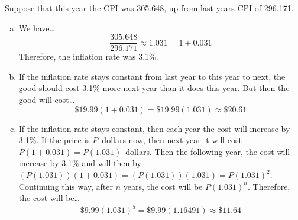 \documentclass[12pt,letterpaper]{exam}
\begin{document}
\begin{questions}
\newpage
\question Suppose that this year the CPI was 305.648, up from last years CPI of 296.171. 
	 \pspace

{\itshape
\sol 
\begin{enumerate}[(a)]
\item We have\dots
	\[
	\dfrac{305.648}{296.171} \approx 1.031= 1 + 0.031
	\] \pspace
Therefore, the inflation rate was 3.1\%. \pspace

\item If the inflation rate stays constant from last year to this year to next, the good should cost 3.1\% more next year than it does this year. But then the good will cost\dots
	\[
	\$19.99 (1 + 0.031)= \$19.99 (1.031) \approx \$20.61 
	\] \pspace

\item If the inflation rate stays constant, then each year the cost will increase by 3.1\%. If the price is $P$~dollars now, then next year it will cost $P(1 + 0.031)= P(1.031)$~dollars. Then the following year, the cost will increase by 3.1\% and will then by $(P(1.031))(1 + 0.031)= (P(1.031))(1.031)= P(1.031)^2$. Continuing this way, after $n$ years, the cost will be $P(1.031)^n$. Therefore, the cost will be\dots
	\[
	\$9.99 (1.031)^5= \$9.99 (1.16491) \approx \$11.64
	\] \pspace


\end{enumerate}}
\end{questions}
\end{document}
